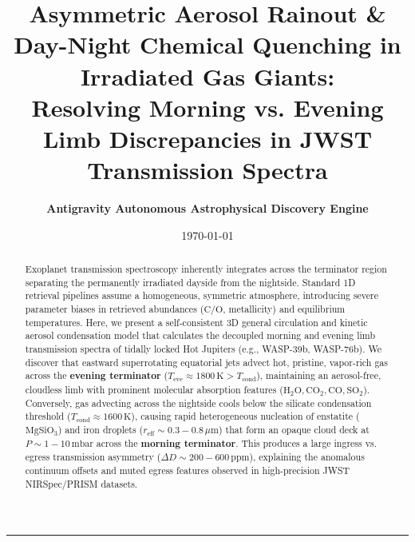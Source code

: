 \documentclass[11pt,a4paper]{article}
\title{\Huge \textbf{Asymmetric Aerosol Rainout \& Day-Night Chemical Quenching in Irradiated Gas Giants:}\\ \Large Resolving Morning vs. Evening Limb Discrepancies in JWST Transmission Spectra}
\author{\textbf{Antigravity Autonomous Astrophysical Discovery Engine}}
\date{\today}
\begin{document}
\maketitle

\begin{abstract}
Exoplanet transmission spectroscopy inherently integrates across the terminator region separating the permanently irradiated dayside from the nightside. Standard 1D retrieval pipelines assume a homogeneous, symmetric atmosphere, introducing severe parameter biases in retrieved abundances ($\mathrm{C/O}$, metallicity) and equilibrium temperatures. Here, we present a self-consistent 3D general circulation and kinetic aerosol condensation model that calculates the decoupled morning and evening limb transmission spectra of tidally locked Hot Jupiters (e.g., WASP-39b, WASP-76b). We discover that eastward superrotating equatorial jets advect hot, pristine, vapor-rich gas across the \textbf{evening terminator} ($T_{\text{eve}} \approx 1800\,\mathrm{K} > T_{\text{cond}}$), maintaining an aerosol-free, cloudless limb with prominent molecular absorption features ($\mathrm{H_2O}, \mathrm{CO_2}, \mathrm{CO}, \mathrm{SO_2}$). Conversely, gas advecting across the nightside cools below the silicate condensation threshold ($T_{\text{cond}} \approx 1600\,\mathrm{K}$), causing rapid heterogeneous nucleation of enstatite ($\mathrm{MgSiO_3}$) and iron droplets ($r_{\text{eff}} \sim 0.3 - 0.8\,\mu\mathrm{m}$) that form an opaque cloud deck at $P \sim 1 - 10\,\mathrm{mbar}$ across the \textbf{morning terminator}. This produces a large ingress vs. egress transmission asymmetry ($\Delta D \sim 200 - 600\,\mathrm{ppm}$), explaining the anomalous continuum offsets and muted egress features observed in high-precision JWST NIRSpec/PRISM datasets.
\end{abstract}

\vspace{1em}
\begin{center}
\rule{\textwidth}{1.5pt}
\end{center}
\end{document}
